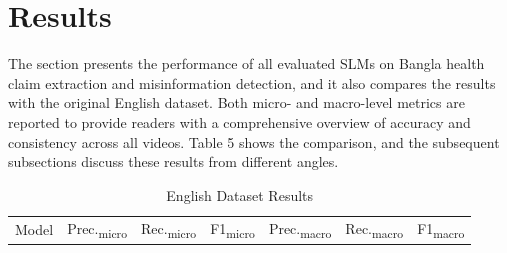 \documentclass[]{article}
\begin{document}
\section{Results}

The section presents the performance of all evaluated SLMs on Bangla
health claim extraction and misinformation detection, and it also
compares the results with the original English dataset. Both micro- and
macro-level metrics are reported to provide readers with a comprehensive
overview of accuracy and consistency across all videos. Table 5 shows
the comparison, and the subsequent subsections discuss these results
from different angles.

\footnotesize
\setlength{\tabcolsep}{2pt}
\begingroup
\footnotesize
\setlength{\tabcolsep}{2pt}
\begin{longtable}[]{@{}
  >{\raggedright\arraybackslash}p{}
  >{\centering\arraybackslash}p{}
  >{\centering\arraybackslash}p{}
  >{\centering\arraybackslash}p{}
  >{\centering\arraybackslash}p{}
  >{\centering\arraybackslash}p{}
  >{\centering\arraybackslash}p{}@{}}
\caption{English Dataset Results}\tabularnewline
\toprule\noalign{}
\begin{minipage}[b]{\linewidth}\raggedright
Model
\end{minipage} & \begin{minipage}[b]{\linewidth}\raggedright
Prec.\textsubscript{micro}
\end{minipage} & \begin{minipage}[b]{\linewidth}\raggedright
Rec.\textsubscript{micro}
\end{minipage} & \begin{minipage}[b]{\linewidth}\raggedright
F1\textsubscript{micro}
\end{minipage} & \begin{minipage}[b]{\linewidth}\raggedright
Prec.\textsubscript{macro}
\end{minipage} & \begin{minipage}[b]{\linewidth}\raggedright
Rec.\textsubscript{macro}
\end{minipage} & \begin{minipage}[b]{\linewidth}\raggedright
F1\textsubscript{macro}
\end{minipage} \\

\end{longtable}
\end{document}
